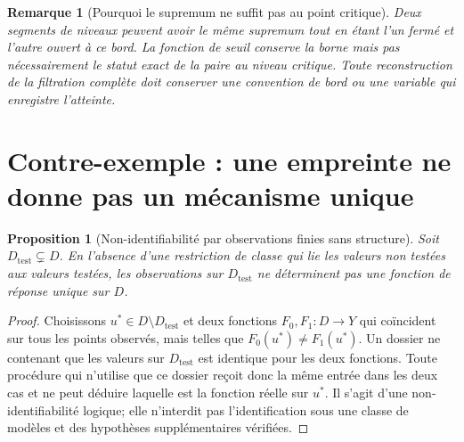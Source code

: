 \documentclass[11pt,a4paper,oneside]{report}
\newtheorem{proposition}{Proposition}[chapter]
\newtheorem{remark}{Remarque}[chapter]
\begin{document}
\begin{remark}[Pourquoi le supremum ne suffit pas au point critique]
Deux segments de niveaux peuvent avoir le même supremum tout en étant l'un fermé et l'autre ouvert à ce bord. La fonction de seuil conserve la borne mais pas nécessairement le statut exact de la paire au niveau critique. Toute reconstruction de la filtration complète doit conserver une convention de bord ou une variable qui enregistre l'atteinte.
\end{remark}

\section{Contre-exemple : une empreinte ne donne pas un mécanisme unique}
\begin{proposition}[Non-identifiabilité par observations finies sans structure]
Soit \(D_{\mathrm{test}}\subsetneq D\). En l'absence d'une restriction de classe qui lie les valeurs non testées aux valeurs testées, les observations sur \(D_{\mathrm{test}}\) ne déterminent pas une fonction de réponse unique sur \(D\).
\end{proposition}
\begin{proof}
Choisissons \(u^*\in D\setminus D_{\mathrm{test}}\) et deux fonctions \(F_0,F_1:D\to Y\) qui coïncident sur tous les points observés, mais telles que \(F_0(u^*)\ne F_1(u^*)\). Un dossier ne contenant que les valeurs sur \(D_{\mathrm{test}}\) est identique pour les deux fonctions. Toute procédure qui n'utilise que ce dossier reçoit donc la même entrée dans les deux cas et ne peut déduire laquelle est la fonction réelle sur \(u^*\). Il s'agit d'une non-identifiabilité logique; elle n'interdit pas l'identification sous une classe de modèles et des hypothèses supplémentaires vérifiées.\end{proof}
\end{document}
